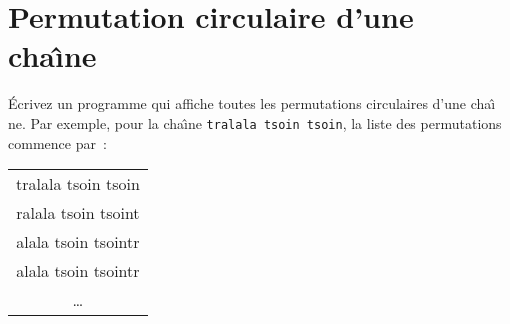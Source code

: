 \section{Permutation circulaire d'une cha\^\i{}ne}
\label{sec:PermutationCirculaire}
\'Ecrivez un programme qui affiche toutes les permutations circulaires
d'une cha\^\i{} ne. Par exemple,   pour la cha\^\i{}ne  \texttt{tralala
  tsoin tsoin}, la liste des permutations commence par~:
\begin{center}
  \begin{tabular}{c}
    tralala tsoin tsoin\\
    ralala tsoin tsoint\\
    alala tsoin tsointr\\
    alala tsoin tsointr\\
    \dots
  \end{tabular}
\end{center}
